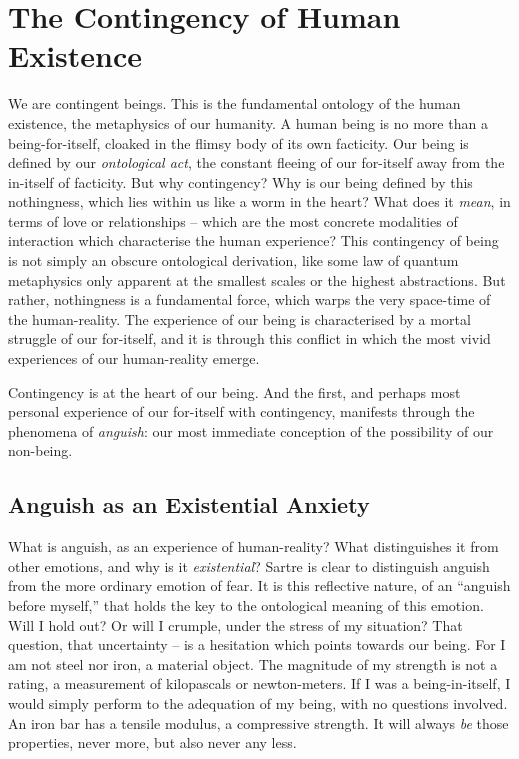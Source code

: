 \chapter{The Contingency of Human Existence}

We are contingent beings. This is the fundamental ontology of the human existence, the metaphysics of our humanity. A human being is no more than a being-for-itself, cloaked in the flimsy body of its own facticity. Our being is defined by our \emph{ontological act}, the constant fleeing of our for-itself away from the in-itself of facticity. But why contingency? Why is our being defined by this nothingness, which lies within us like a worm in the heart? What does it \emph{mean}, in terms of love or relationships -- which are the most concrete modalities of interaction which characterise the human experience? This contingency of being is not simply an obscure ontological derivation, like some law of quantum metaphysics only apparent at the smallest scales or the highest abstractions. But rather, nothingness is a fundamental force, which warps the very space-time of the human-reality. The experience of our being is characterised by a mortal struggle of our for-itself, and it is through this conflict in which the most vivid experiences of our human-reality emerge. 

Contingency is at the heart of our being. And the first, and perhaps most personal experience of our for-itself with contingency, manifests through the phenomena of \emph{anguish}: our most immediate conception of the possibility of our non-being.

\section{Anguish as an Existential Anxiety}

What is anguish, as an experience of human-reality? What distinguishes it from other emotions, and why is it \emph{existential}?
Sartre is clear to distinguish anguish from the more ordinary emotion of fear.  It is this reflective nature, of an \enquote{anguish before myself,} that holds the key to the ontological meaning of this emotion.
Will I hold out? Or will I crumple, under the stress of my situation?
That question, that uncertainty -- is a hesitation which points towards our being. For I am not steel nor iron, a material object.
The magnitude of my strength is not a rating, a measurement of kilopascals or newton-meters. If I was a being-in-itself, I would simply perform to the adequation of my being, with no questions involved. An iron bar has a tensile modulus, a compressive strength. It will always \emph{be} those properties, never more, but also never any less.

